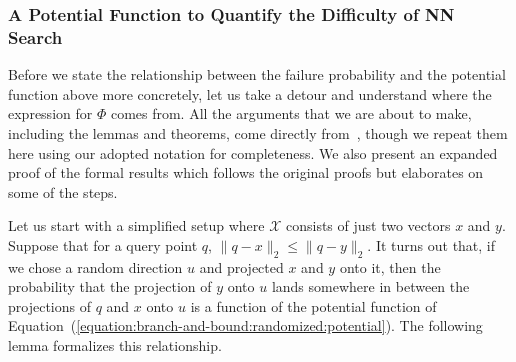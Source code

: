 \subsubsection{A Potential Function to Quantify the Difficulty of NN Search}

Before we state the relationship between the failure probability and the potential function above more concretely,
let us take a detour and understand where the expression for $\Phi$ comes from. All the arguments that we are about
to make, including the lemmas and theorems, come directly from~\cite{dasgupta2015rptrees}, 
though we repeat them here using our adopted notation for completeness. We also present an
expanded proof of the formal results which follows the original proofs but elaborates on some of the steps.

\medskip

Let us start with a simplified setup where $\mathcal{X}$ consists of just two vectors $x$ and $y$.
Suppose that for a query point $q$, $\lVert q - x \rVert_2 \leq \lVert q - y \rVert_2$.
It turns out that, if we chose a random direction $u$ and projected $x$ and $y$ onto it,
then the probability that the projection of $y$ onto $u$ lands somewhere in between the projections of
$q$ and $x$ onto $u$ is a function of the potential function of Equation~(\ref{equation:branch-and-bound:randomized:potential}).
The following lemma formalizes this relationship.

